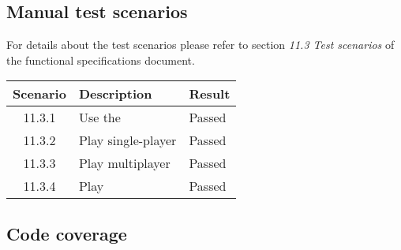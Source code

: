 \subsection{Manual test scenarios}

For details about the test scenarios please refer to section \emph{11.3 Test scenarios} of the functional specifications document.\par

\begin{tabular}{cll}

\hline
	\textbf{Scenario} & \textbf{Description} & \textbf{Result} \\
	\hline
	11.3.1 & Use the \gameexplorer & Passed \\
	11.3.2 & Play \graphcoloring single-player & Passed \\
	11.3.3 & Play \graphcoloring multiplayer & Passed \\
	11.3.4 & Play \twixt & Passed \\
	\hline
\end{tabular}

\subsection{Code coverage}

